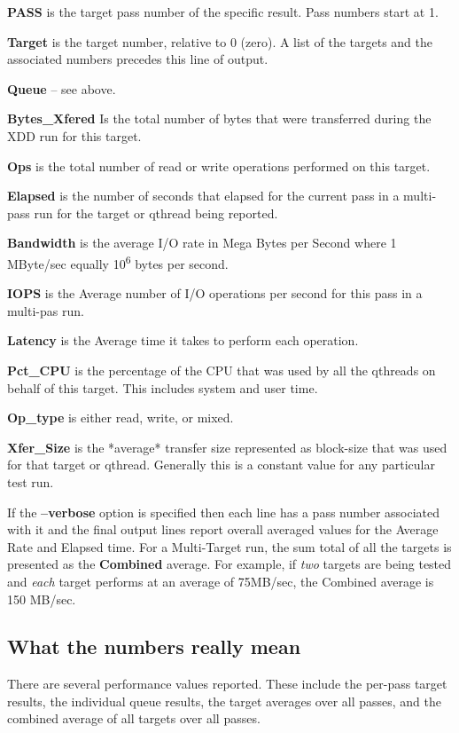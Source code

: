 \textbf{PASS} is the target pass number of the specific result. Pass numbers start at 1.

\textbf{Target} is the target number, relative to 0 (zero). A list of the targets and the associated numbers precedes this line of output.

\textbf{Queue} -- see above.

\textbf{Bytes\_Xfered} Is the total number of bytes that were transferred during the XDD run for this target.

\textbf{Ops} is the total number of read or write operations performed on this target.

\textbf{Elapsed} is the number of seconds that elapsed for the current pass in a multi-pass run for the target or qthread being reported.

\textbf{Bandwidth} is the average I/O rate in Mega Bytes per Second where 1 MByte/sec equally 10\textsuperscript{6} bytes per second.

\textbf{IOPS} is the Average number of I/O operations per second for this pass in a multi-pas run.

\textbf{Latency} is the Average time it takes to perform each operation.

\textbf{Pct\_CPU} is the percentage of the CPU that was used by all the qthreads on behalf of this target. This includes system and user time.

\textbf{Op\_type} is either read, write, or mixed.

\textbf{Xfer\_Size} is the *average* transfer size represented as block-size that was used for that target or qthread. Generally this is a constant value for any particular test run.

If the \textbf{--verbose} option is specified then each line has a pass number associated with it and the final output lines report overall averaged values for the Average Rate and Elapsed time. For a Multi-Target run, the sum total of all the targets is presented as the \textbf{Combined} average. For example, if \emph{two} targets are being tested and \emph{each} target performs at an average of 75MB/sec, the Combined average is 150 MB/sec.

\subsection{}\label{section}

\subsection{What the numbers really mean}\label{what-the-numbers-really-mean}

There are several performance values reported. These include the per-pass target results, the individual queue results, the target averages over all passes, and the combined average of all targets over all passes.

